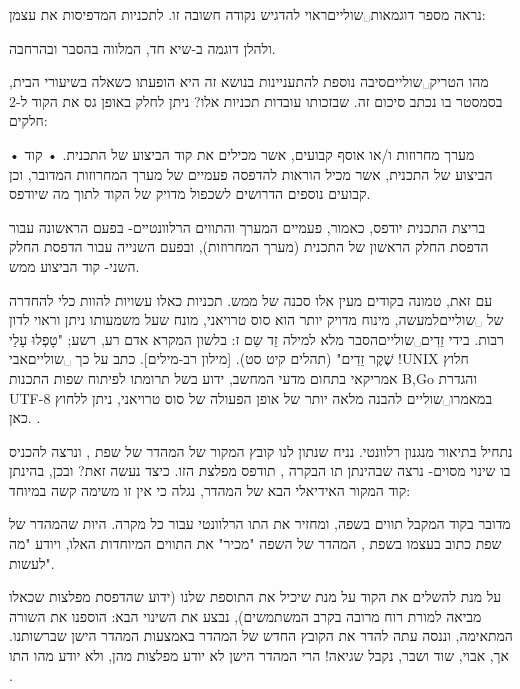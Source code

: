 נראה מספר דוגמאות␣שוליים{ראוי להדגיש נקודה חשובה זו.} לתכניות המדפיסות את עצמן:





ולהלן דוגמה ב-שיא חד, המלווה בהסבר ובהרחבה.

מהו הטריק␣שוליים{סיבה נוספת להתעניינות בנושא זה היא הופעתו כשאלה בשיעורי הבית, בסמסטר בו נכתב סיכום זה.} שבזכותו עובדות תכניות אלו? ניתן לחלק באופן גס את הקוד ל-2 חלקים:
\begin{enumerate}
• מערך מחרוזות ו/או אוסף קבועים, אשר מכילים את קוד הביצוע של התכנית.
• קוד הביצוע של התכנית, אשר מכיל הוראות להדפסה פעמיים של מערך המחרוזות המדובר,
וכן קבועים נוספים הדרושים לשכפול מדויק של הקוד לתוך מה שיודפס.

\end{enumerate}
בריצת התכנית יודפס, כאמור, פעמיים המערך והתווים הרלוונטיים- בפעם הראשונה עבור
הדפסת החלק הראשון של התכנית (מערך המחרוזות), ובפעם השנייה עבור הדפסת החלק השני-
קוד הביצוע ממש.

עם זאת, טמונה בקודים מעין אלו סכנה של ממש. תכניות כאלו עשויות להוות כלי להחדרה
של ␣שוליים{למעשה, מינוח מדויק יותר הוא סוס טרויאני, מונח שעל
משמעותו ניתן וראוי לדון רבות.} בידי זֵדִים␣שוליים{הסבר מלא למילה זֵד שֵם ז:
בלשון המקרא אדם רע, רשע; "טָפְלוּ עָלַי שֶׁקֶר זֵדִים" (תהלים קיט סט). [מילון רב-מילים]}.
כתב על כך ␣שוליים{אבי !UNIX חלוץ אמריקאי בתחום מדעי
המחשב, ידוע בשל תרומתו לפיתוח שפות התכנות B,Go והגדרת UTF-8} במאמרו␣שוליים
{להבנה מלאה יותר של אופן הפעולה של סוס טרויאני, ניתן ללחוץ כאן.  }.

נתחיל בתיאור מנגנון רלוונטי. נניח שנתון לנו קובץ המקור של המהדר של שפת ,
ונרצה להכניס בו שינוי מסוים- נרצה שבהינתן תו הבקרה , תודפס מפלצת
 הזו. כיצד נעשה זאת? ובכן, בהינתן קוד המקור האידיאלי הבא של המהדר,
נגלה כי אין זו משימה קשה במיוחד:

מדובר בקוד המקבל תווים בשפה, ומחזיר את התו הרלוונטי עבור כל מקרה. היות שהמהדר
של שפת  כתוב בעצמו בשפת , המהדר של השפה "מכיר" את התווים המיוחדות האלו,
ויודע "מה לעשות".

על מנת להשלים את הקוד על מנת שיכיל את התוספת שלנו (ידוע שהדפסת מפלצות
 שכאלו מביאה למורת רוח מרובה בקרב המשתמשים), נבצע את השינוי הבא:
הוספנו את השורה המתאימה, וננסה עתה להדר את הקובץ החדש של המהדר באמצעות המהדר
הישן שברשותנו. אך, אבוי, שוד ושבר, נקבל שגיאה! הרי המהדר הישן לא יודע מפלצות
 מהן, ולא יודע מהו התו .

